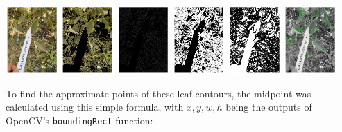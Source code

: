 \documentclass[final,5p,times,twocolumn,authoryear]{elsarticle}
\begin{document}
\begin{center}
	\centering
	\includegraphics[width=0.15\textwidth]{images/seg_pipeline/1.png}	
        \includegraphics[width=0.15\textwidth]{images/seg_pipeline/2.png}      	\includegraphics[width=0.15\textwidth]{images/seg_pipeline/3.png}	
	\includegraphics[width=0.15\textwidth]{images/seg_pipeline/4.png}	
	\includegraphics[width=0.15\textwidth]{images/seg_pipeline/5.png}	
	\includegraphics[width=0.15\textwidth]{images/seg_pipeline/6.png}	
\end{center}

To find the approximate points of these leaf contours, the midpoint was calculated using this simple formula, with $x, y, w, h$ being the outputs of OpenCV's \verb|boundingRect| function:
\end{document}

